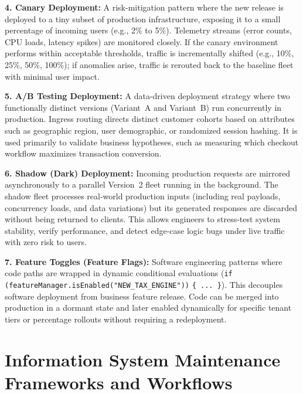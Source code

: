 \documentclass[11pt,a4paper]{article}
\begin{document}
\textbf{4. Canary Deployment:} A risk-mitigation pattern where the new release is deployed to a tiny subset of production infrastructure, exposing it to a small percentage of incoming users (e.g., 2\% to 5\%). Telemetry streams (error counts, CPU loads, latency spikes) are monitored closely. If the canary environment performs within acceptable thresholds, traffic is incrementally shifted (e.g., 10\%, 25\%, 50\%, 100\%); if anomalies arise, traffic is rerouted back to the baseline fleet with minimal user impact.

\textbf{5. A/B Testing Deployment:} A data-driven deployment strategy where two functionally distinct versions (Variant~A and Variant~B) run concurrently in production. Ingress routing directs distinct customer cohorts based on attributes such as geographic region, user demographic, or randomized session hashing. It is used primarily to validate business hypotheses, such as measuring which checkout workflow maximizes transaction conversion.

\textbf{6. Shadow (Dark) Deployment:} Incoming production requests are mirrored asynchronously to a parallel Version~2 fleet running in the background. The shadow fleet processes real-world production inputs (including real payloads, concurrency loads, and data variations) but its generated responses are discarded without being returned to clients. This allows engineers to stress-test system stability, verify performance, and detect edge-case logic bugs under live traffic with zero risk to users.

\textbf{7. Feature Toggles (Feature Flags):} Software engineering patterns where code paths are wrapped in dynamic conditional evaluations (\texttt{if (featureManager.}\allowbreak\texttt{isEnabled(}\allowbreak\texttt{"NEW\_TAX\_}\allowbreak\texttt{ENGINE"))} \texttt{\{ ... \}}). This decouples software deployment from business feature release. Code can be merged into production in a dormant state and later enabled dynamically for specific tenant tiers or percentage rollouts without requiring a redeployment.

\section{Information System Maintenance Frameworks and Workflows}
\label{sec:system_maintenance}
\end{document}

